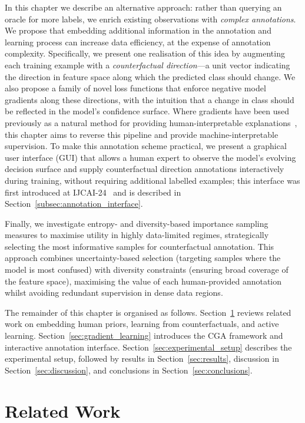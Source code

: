 In this chapter we describe an alternative approach: rather than querying an oracle for more labels, we enrich existing observations with \emph{complex annotations}. We propose that embedding additional information in the annotation and learning process can increase data efficiency, at the expense of annotation complexity. Specifically, we present one realisation of this idea by augmenting each training example with a \emph{counterfactual direction}---a unit vector indicating the direction in feature space along which the predicted class should change. We also propose a family of novel loss functions that enforce negative model gradients along these directions, with the intuition that a change in class should be reflected in the model's confidence surface. Where gradients have been used previously as a natural method for providing human-interpretable explanations~\cite{simonyan2013deep}, this chapter aims to reverse this pipeline and provide machine-interpretable supervision. To make this annotation scheme practical, we present a graphical user interface (GUI) that allows a human expert to observe the model's evolving decision surface and supply counterfactual direction annotations interactively during training, without requiring additional labelled examples; this interface was first introduced at IJCAI-24~\cite{erskine2024ijcai} and is described in Section~\ref{subsec:annotation_interface}.

Finally, we investigate entropy- and diversity-based importance sampling measures to maximise utility in highly data-limited regimes, strategically selecting the most informative samples for counterfactual annotation. This approach combines uncertainty-based selection (targeting samples where the model is most confused) with diversity constraints (ensuring broad coverage of the feature space), maximising the value of each human-provided annotation whilst avoiding redundant supervision in dense data regions.

The remainder of this chapter is organised as follows. Section~\ref{related_work} reviews related work on embedding human priors, learning from counterfactuals, and active learning. Section~\ref{sec:gradient_learning} introduces the CGA framework and interactive annotation interface. Section~\ref{sec:experimental_setup} describes the experimental setup, followed by results in Section~\ref{sec:results}, discussion in Section~\ref{sec:discussion}, and conclusions in Section~\ref{sec:conclusions}.

\section{Related Work}
\label{related_work}

